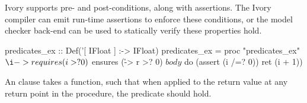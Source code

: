 Ivory supports pre- and post-conditions, along with assertions.  The
Ivory compiler can emit run-time assertions to enforce these
conditions, or the model checker back-end can be used to statically
verify these properties hold.

\begin{code}
predicates_ex :: Def('[ IFloat ] :-> IFloat)
predicates_ex = proc "predicates_ex" $
    \i -> requires (i >? 0)
        $ ensures (\r -> r >? 0)
        $ body
        $ do (assert (i /=? 0))
             ret (i + 1))
\end{code}

\noindent
An  clause takes a function, such that when applied to the return
value at any return point in the procedure, the predicate should hold.









